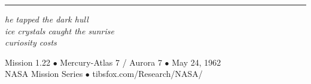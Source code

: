 \documentclass[12pt, letterpaper]{article}
\begin{document}
\vspace{2em}
\begin{center}
\noindent\rule{0.3\textwidth}{0.4pt}
\end{center}
\vspace{1em}

\begin{center}
\textit{he tapped the dark hull\\
ice crystals caught the sunrise\\
curiosity costs}
\end{center}

\vspace{2em}
\begin{center}
{\small Mission 1.22 $\bullet$ Mercury-Atlas 7 / Aurora 7 $\bullet$ May 24, 1962\\
NASA Mission Series $\bullet$ tibsfox.com/Research/NASA/}
\end{center}
\end{document}
